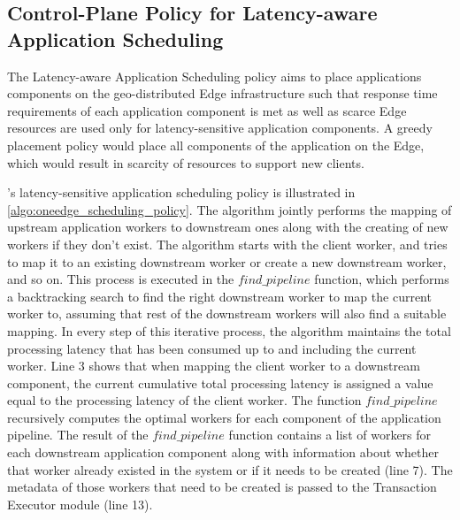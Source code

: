 \subsection{Control-Plane Policy for Latency-aware Application Scheduling}
\label{sec:oneedge_latency_aware_placement}
The Latency-aware Application Scheduling policy aims to place applications components on the geo-distributed Edge infrastructure such that response time requirements of each application component is met as well as scarce Edge resources are used only for latency-sensitive application components. A greedy placement policy would place all components of the application on the Edge, which would result in scarcity of resources to support new clients.
\par \oneedge{}'s latency-sensitive application scheduling policy is illustrated in \cref{algo:oneedge_scheduling_policy}. The algorithm jointly performs the mapping of upstream application workers to downstream ones along with the creating of new workers if they don't exist. The algorithm starts with the client worker, and tries to map it to an existing downstream worker or create a new downstream worker, and so on. This process is executed in the $find\_pipeline$ function, which performs a backtracking search to find the right downstream worker to map the current worker to, assuming that rest of the downstream workers will also find a suitable mapping. In every step of this iterative process, the algorithm maintains the total processing latency that has been consumed
up to and including the current worker. Line 3 shows that when mapping the client worker to a downstream component, the current cumulative total processing latency is assigned a value equal to the processing latency of the client worker. The function $find\_pipeline$ recursively computes the optimal workers for each component of the application pipeline. The result of the $find\_pipeline$ function contains a list of workers for each downstream application component along with information about whether that worker already existed in the system or if it needs to be created (line 7). The metadata of those workers that need to be created is passed to the Transaction Executor module (line 13).

